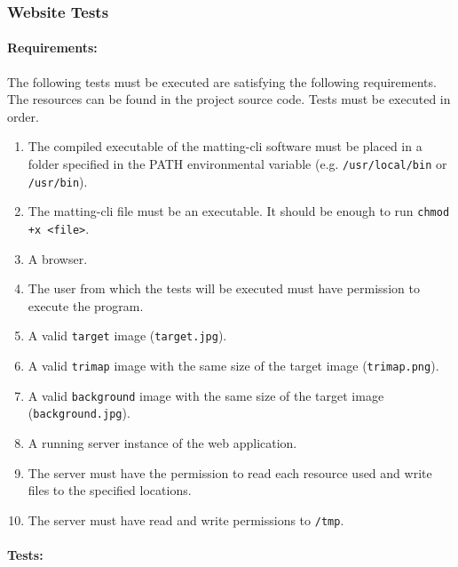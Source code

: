 \documentclass[a4paper]{article}
\begin{document}
\pagebreak

\subsubsection{Website Tests}

\paragraph{Requirements:}
The following tests must be executed are satisfying the
following requirements. The resources can be found in the project source code.
Tests must be executed in order.

\begin{enumerate}
    \item The compiled executable of the matting-cli software
    must be placed in a folder specified in the \textsc{PATH}
    environmental variable (e.g. \texttt{/usr/local/bin} or \texttt{/usr/bin}).
    \item The matting-cli file must be an executable. It should be enough to run
    \lstinline{chmod +x <file>}.
    \item A browser.
    \item The user from which the tests will be executed must have permission to execute
    the program.
    \item A valid \texttt{target} image (\texttt{target.jpg}).
    \item A valid \texttt{trimap} image with the same size of the target image (\texttt{trimap.png}).
    \item A valid \texttt{background} image with the same size of the target image (\texttt{background.jpg}).
    \item A running server instance of the web application.
    \item The server must have the permission to read each resource used and write files
    to the specified locations.
    \item The server must have read and write permissions to \texttt{/tmp}.
\end{enumerate}

\paragraph{Tests:}

\end{document}
